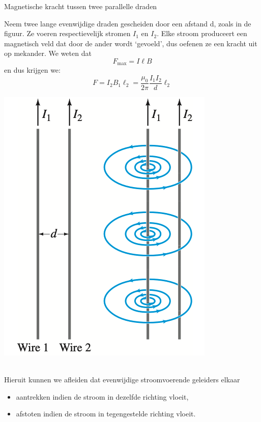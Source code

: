\begin{app}{Magnetische kracht tussen twee parallelle draden}
    \begin{minipage}{0.77\textwidth}
        Neem twee lange evenwijdige draden gescheiden door een afstand d, zoals in de figuur. Ze voeren respectievelijk stromen $I_1$ en $I_2$.
        Elke stroom produceert een magnetisch veld dat door de ander wordt ‘gevoeld’, dus oefenen ze een kracht uit op mekander. We weten dat
        \begin{equation*}
            F_{\text{max}} = I\ell B
        \end{equation*}
        en dus krijgen we:
        \begin{equation*}
            F = I_{2}B_{1}\ell_{2} = \dfrac{\mu_0}{2\pi}\dfrac{I_{1}I_{2}}{d}\ell_{2}
        \end{equation*}
    \end{minipage}
    \begin{minipage}{.19\textwidth}
        \includegraphics[scale=0.225]{Images/Magnetisme/MagnetischeKrachtTussenTweeParallelleDraden}
    \end{minipage} \vspace{0.2cm}\\
    Hieruit kunnen we afleiden dat evenwijdige stroomvoerende geleiders elkaar
    \begin{itemize}
        \item aantrekken indien de stroom in dezelfde richting vloeit,
        \item afstoten indien de stroom in tegengestelde richting vloeit.
    \end{itemize}
\end{app}

